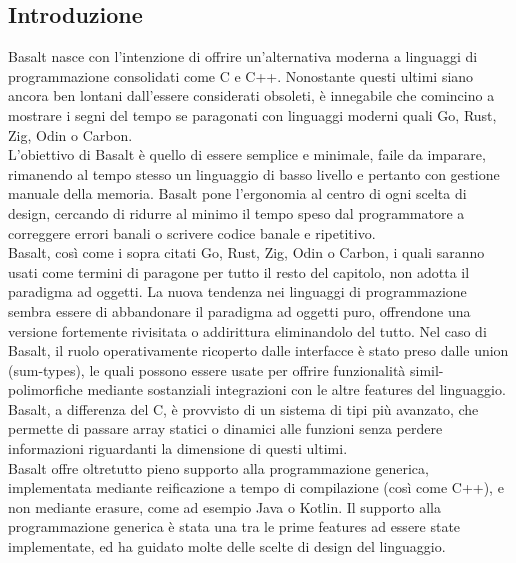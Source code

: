 \subsection{Introduzione}
Basalt nasce con l'intenzione di offrire un'alternativa moderna a linguaggi di programmazione 
consolidati come C e C++. Nonostante questi ultimi siano ancora ben lontani dall'essere considerati 
obsoleti, è innegabile che comincino a mostrare i segni del tempo se
paragonati con linguaggi moderni quali Go, Rust, Zig, Odin o Carbon. \\

L’obiettivo di Basalt è quello di essere semplice e minimale, faile da imparare, rimanendo 
al tempo stesso un linguaggio di basso livello e pertanto con gestione manuale della memoria. 
Basalt pone l'ergonomia al centro di ogni scelta di design, cercando di ridurre al minimo il tempo
speso dal programmatore a correggere errori banali o scrivere codice banale e ripetitivo. \\

Basalt, così come i sopra citati Go, Rust, Zig, Odin o Carbon, i quali saranno usati come 
termini di paragone per tutto il resto del capitolo, non adotta il paradigma ad oggetti. La 
nuova tendenza nei linguaggi di programmazione sembra essere di abbandonare il paradigma ad 
oggetti puro, offrendone una versione fortemente rivisitata o addirittura eliminandolo del tutto. Nel 
caso di Basalt, il ruolo operativamente ricoperto dalle interfacce è stato preso dalle union (sum-types),
le quali possono essere usate per offrire funzionalità simil-polimorfiche mediante sostanziali integrazioni
con le altre features del linguaggio. \\

Basalt, a differenza del C, è provvisto di un sistema di tipi più avanzato, che permette di
passare array statici o dinamici alle funzioni senza perdere informazioni riguardanti la dimensione di 
questi ultimi. \\

Basalt offre oltretutto pieno supporto alla programmazione generica, implementata mediante reificazione
a tempo di compilazione (così come C++), e non mediante erasure, come ad esempio Java o Kotlin. Il supporto alla 
programmazione generica è stata una tra le prime features ad essere state implementate, ed ha guidato
molte delle scelte di design del linguaggio. \\ 



\newpage
 \newpage
 \newpage
 \newpage